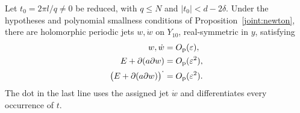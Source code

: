 \begin{lemma}
\label{joint:compatibility}
Let \(t_0=2\pi l/q\ne0\) be reduced, with \(q\le N\) and
\(|t_0|<d-2\delta\).  Under the hypotheses and polynomial smallness
conditions of Proposition~\ref{joint:newton}, there are holomorphic
periodic jets \(w,\dot w\) on \(Y_{10}\), real-symmetric in \(y\),
satisfying
\begin{align}
 w,\dot w&=O_{\mathrm p}(\varepsilon),\notag\\
 E+\partial(a\partial w)&=O_{\mathrm p}(\varepsilon^2),
 \label{joint:value-compatibility}\\
 \bigl(E+\partial(a\partial w)\bigr)^{\displaystyle\cdot}
   &=O_{\mathrm p}(\varepsilon^2).
 \label{joint:jet-compatibility}
\end{align}
The dot in the last line uses the assigned jet \(\dot w\) and
differentiates every occurrence of \(t\).
\end{lemma}

